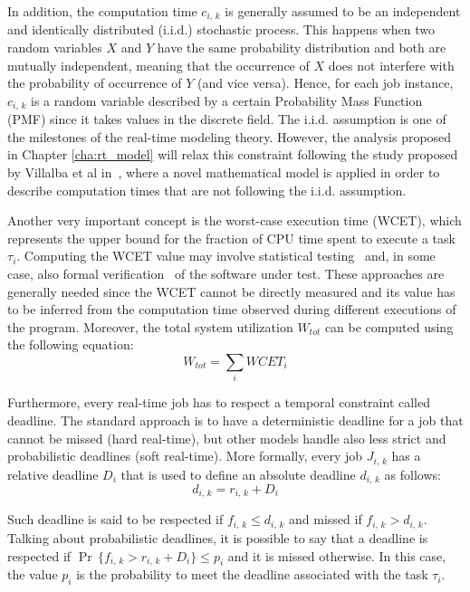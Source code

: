 In addition, the computation time \( c_{i,\,k} \) is generally assumed to be an
independent and identically distributed (i.i.d.) stochastic process.
This happens when two random variables \( X \) and \( Y \) have 
the same probability distribution and both are mutually
independent, meaning that the occurrence of \( X \) does not interfere with 
the probability of occurrence of \( Y \) (and vice versa).
Hence, for each job instance, \( c_{i,\,k} \) is a random
variable described by a certain Probability Mass Function (PMF) since it
takes values in the discrete field.
The i.i.d. assumption is one of the milestones of the real-time modeling theory.
However, the analysis proposed in Chapter \ref{cha:rt_model} will relax this 
constraint following the study proposed by Villalba et al
in~\cite{villalba2017probabilistic}, where a novel mathematical model is applied
in order to describe computation times that are not following the i.i.d.
assumption.

Another very important concept is the worst-case execution time (WCET), which
represents the upper bound for the fraction of CPU time spent to execute a task
\( \tau_{i} \). Computing the WCET value may involve statistical testing~\cite{bernat2002wcet}
and, in some case, also formal verification~\cite{souyris2009formal} of the
software under test. These approaches are generally needed since the WCET cannot
be directly measured and its value has to be inferred from the computation time
observed during different executions of the program.
Moreover, the total system utilization \( W_{tot} \) can be computed using
the following equation:
\begin{equation}\label{eq:system_utilization}
    W_{tot} = \displaystyle\sum_{i} WCET_{i}
\end{equation}

Furthermore, every real-time job has to respect a temporal constraint called
deadline. The standard approach is to have a deterministic deadline for a job
that cannot be missed (hard real-time), but other models handle also
less strict and probabilistic deadlines (soft real-time).
More formally, every job \( J_{i,\,k} \) has a relative deadline \( D_{i} \) that
is used to define an absolute deadline \( d_{i,\,k} \) as follows:
\begin{equation}
    d_{i,\,k} = r_{i,\,k} + D_{i}
\end{equation}

Such deadline is said to be respected if \( f_{i,\,k} \leq d_{i,\,k} \) and missed
if \( f_{i,\,k} > d_{i,\,k} \). Talking about probabilistic deadlines, it is
possible to say that a deadline is respected if 
\( \Pr\,\{f_{i,\,k} > r_{i,\,k} + D_{i} \} \leq p_{i} \) and it is missed otherwise.
In this case, the value \( p_{i} \) is the probability to meet the deadline associated
with the task \( \tau_{i} \).


